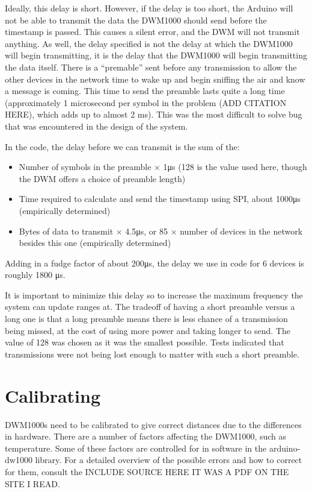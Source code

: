 Ideally, this delay is short. However, if the delay is too short, the Arduino will not be able to transmit the data the DWM1000 should send before the timestamp is passed. This causes a silent error, and the DWM will not transmit anything. As well, the delay specified is not the delay at which the DWM1000 will begin transmitting, it is the delay that the DWM1000 will begin transmitting the data itself. There is a ``premable'' sent before any transmission to allow the other devices in the network time to wake up and begin sniffing the air and know a message is coming. This time to send the preamble lasts quite a long time (approximately 1 microsecond per symbol in the problem (ADD CITATION HERE), which adds up to almost 2 ms). This was the most difficult to solve bug that was encountered in the design of the system.

In the code, the delay before we can transmit is the sum of the:
\begin{itemize}
	\item Number of symbols in the preamble $\times$ 1\si{\micro\second} (128 is the value used here, though the DWM offers a choice of preamble length)
	\item Time required to calculate and send the timestamp using SPI, about 1000\si{\micro\second} (empirically determined)
	\item Bytes of data to transmit $\times$ 4.5\si{\micro\second}, or 85 $\times$ number of devices in the network besides this one (empirically determined)
\end{itemize}

Adding in a fudge factor of about 200\si{\micro\second}, the delay we use in code for 6 devices is roughly 1800 \si{\micro\second}.

It is important to minimize this delay so to increase the maximum frequency the system can update ranges at. The tradeoff of having a short preamble versus a long one is that a long preamble means there is less chance of a transmission being missed, at the cost of using more power and taking longer to send. The value of 128 was chosen as it was the smallest possible. Tests indicated that transmissions were not being lost enough to matter with such a short preamble.

\section{Calibrating}
DWM1000s need to be calibrated to give correct distances due to the differences in hardware. There are a number of factors affecting the DWM1000, such as temperature. Some of these factors are controlled for in software in the arduino-dw1000 library. For a detailed overview of the possible errors and how to correct for them, consult the INCLUDE SOURCE HERE IT WAS A PDF ON THE SITE I READ.

